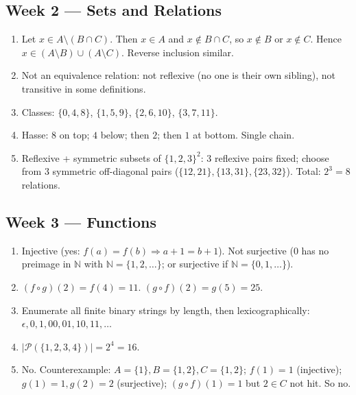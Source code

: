 \documentclass[11pt]{article}
\newcommand{\N}{\mathbb{N}}
\begin{document}
\subsection*{Week 2 — Sets and Relations}
\begin{enumerate}[nosep,label=\arabic*.]
  \item Let $x\in A\setminus(B\cap C)$. Then $x\in A$ and $x\notin B\cap C$, so $x\notin B$ or $x\notin C$. Hence $x\in(A\setminus B)\cup(A\setminus C)$. Reverse inclusion similar.
  \item Not an equivalence relation: not reflexive (no one is their own sibling), not transitive in some definitions.
  \item Classes: $\{0,4,8\}$, $\{1,5,9\}$, $\{2,6,10\}$, $\{3,7,11\}$.
  \item Hasse: $8$ on top; $4$ below; then $2$; then $1$ at bottom. Single chain.
  \item Reflexive + symmetric subsets of $\{1,2,3\}^2$: 3 reflexive pairs fixed; choose from 3 symmetric off-diagonal pairs ($\{12,21\},\{13,31\},\{23,32\}$). Total: $2^3=8$ relations.
\end{enumerate}

\subsection*{Week 3 — Functions}
\begin{enumerate}[nosep,label=\arabic*.]
  \item Injective (yes: $f(a)=f(b)\Rightarrow a+1=b+1$). Not surjective ($0$ has no preimage in $\N$ with $\N=\{1,2,\ldots\}$; or surjective if $\N=\{0,1,\ldots\}$).
  \item $(f\circ g)(2)=f(4)=11$. $(g\circ f)(2)=g(5)=25$.
  \item Enumerate all finite binary strings by length, then lexicographically: $\epsilon,0,1,00,01,10,11,\ldots$
  \item $|\mathcal{P}(\{1,2,3,4\})|=2^4=16$.
  \item No. Counterexample: $A=\{1\},B=\{1,2\},C=\{1,2\}$; $f(1)=1$ (injective); $g(1)=1,g(2)=2$ (surjective); $(g\circ f)(1)=1$ but $2\in C$ not hit. So no.
\end{enumerate}
\end{document}
